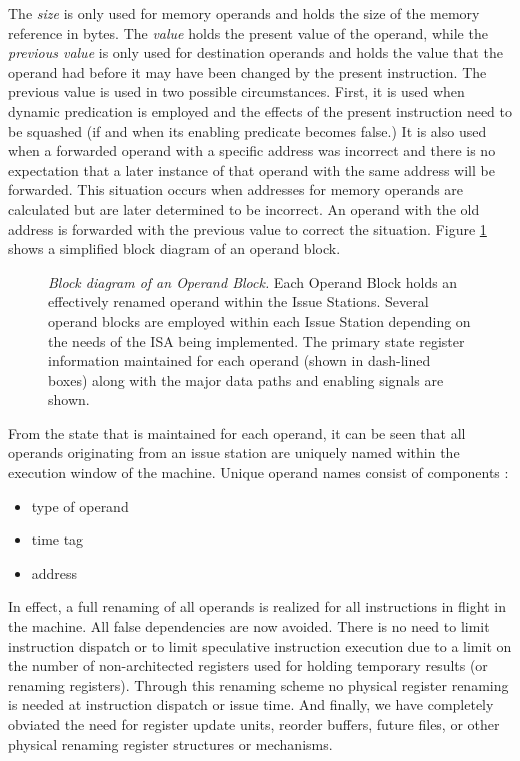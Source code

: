 \documentclass[10pt,dvips]{article}
\begin{document}
The \textit{size} is only used for memory operands and holds
the size of the memory reference in bytes.
The \textit{value} holds the present value of the operand,
while the \textit{previous value} is only used for destination
operands and holds the value that the operand
had before it may have been changed by the present instruction.
The previous value is used in two possible circumstances.
First, it is used when dynamic predication is
employed and the effects of the present instruction need to be
squashed (if and when its enabling predicate becomes false.)
It is also used when a forwarded operand with a specific
address was incorrect 
and there is no expectation that a later instance
of that operand with the same address will be forwarded.
This situation occurs when addresses for memory operands are
calculated but are later determined to be incorrect.
An operand with the old address is forwarded with the previous
value to correct the situation.
Figure \ref{fig:operand} shows a simplified block diagram of
an operand block.
%
\begin{figure}
\centering
\scriptsize {
}
\caption{{\em Block diagram of an Operand Block.} 
Each Operand Block holds an effectively renamed 
operand within the Issue Stations.
Several operand blocks are employed within each Issue Station
depending on the needs of the ISA being implemented.
The primary state register information maintained for each operand (shown in
dash-lined boxes)
along with the major data paths and enabling signals are shown.}
\label{fig:operand}
\end{figure}
%

From the state that is maintained for each operand, it can be seen
that all operands originating from an issue station
are uniquely named within the
execution window of the machine.
Unique operand names consist of components :
%
\begin{itemize}
\vspace{-0.10in}
\item{type of operand}
\vspace{-0.10in}
\item{time tag}
\vspace{-0.10in}
\item{address}
\vspace{-0.10in}
\end{itemize}   
%
In effect, a full renaming of
all operands is realized for all instructions
in flight in the machine.  
All false dependencies are now avoided.
There is no need to limit instruction dispatch or to limit speculative
instruction execution due to a limit on the number of non-architected
registers used for holding temporary results (or renaming registers).
Through this renaming scheme
no physical register renaming is needed at instruction dispatch
or issue time.  
And finally, we have completely obviated the need for
register update units, reorder buffers, future files, or other physical 
renaming register structures or mechanisms.
%
%
\end{document}
